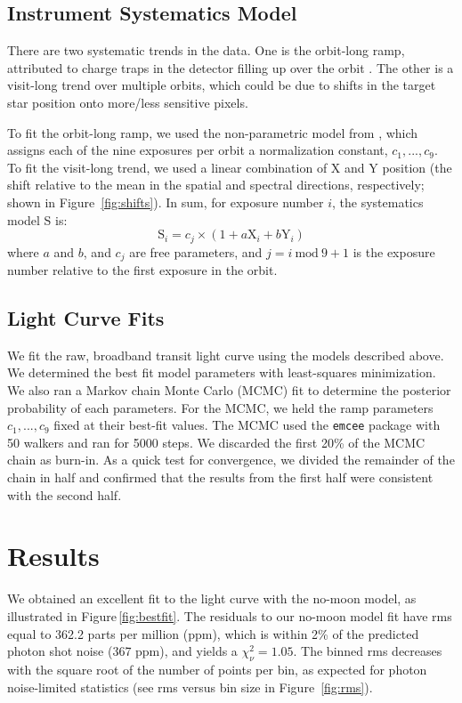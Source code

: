 \documentclass[twocolumn]{aastex62}
\newcommand{\Mod}[1]{\ \mathrm{mod}\ #1}
\begin{document}
\subsection{Instrument Systematics Model}
There are two systematic trends in the data. One is the orbit-long ramp, attributed to charge traps in the detector filling up over the orbit \citep{zhou17}. The other is a visit-long trend over multiple orbits, which could be due to shifts in the target star position onto more/less sensitive pixels.

To fit the orbit-long ramp, we used the non-parametric model from \cite{teachey18b}, which assigns each of the nine exposures per orbit a normalization constant, $c_1, ..., c_9$. To fit the visit-long trend, we used a linear combination of X and Y position (the shift relative to the mean in the spatial and spectral directions, respectively; shown in Figure~\ref{fig:shifts}).  In sum, for exposure number $i$, the systematics model S is:
\begin{equation}
\label{eq:sys}
    \mathrm{S}_i = c_{j}\times(1 + a\mathrm{X}_i + b\mathrm{Y}_i) 
\end{equation}
where $a$ and $b$, and $c_j$ are free parameters, and $j = i\Mod9 + 1$ is the exposure number relative to the first exposure in the orbit.


\subsection{Light Curve Fits}
We fit the raw, broadband transit light curve using the models described above.  We determined the best fit model parameters with least-squares minimization.  We also ran a Markov chain Monte Carlo (MCMC) fit to determine the posterior probability of each parameters. For the MCMC, we held the ramp parameters $c_1, ..., c_9$ fixed at their best-fit values.  The MCMC used the \texttt{emcee} package \citep{foremanmackey13} with 50 walkers and ran for 5000 steps. We discarded the first 20\% of the MCMC chain as burn-in. As a quick test for convergence, we divided the remainder of the chain in half and confirmed that the results from the first half were consistent with the second half.


\section{Results}
We obtained an excellent fit to the light curve with the no-moon model, as illustrated in  Figure\,\ref{fig:bestfit}. The residuals to our no-moon model fit have rms equal to 362.2 parts per million (ppm), which is within 2\% of the predicted photon shot noise (367 ppm), and yields a $\chi_\nu^2 = 1.05$. The binned rms decreases with the square root of the number of points per bin, as expected for photon noise-limited statistics (see rms versus bin size in Figure~\ref{fig:rms}).
\end{document}
